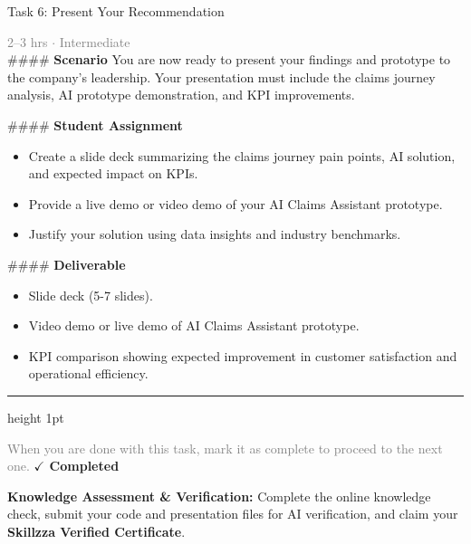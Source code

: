 \documentclass[10pt,a4paper]{article}
\begin{document}
\begin{taskbox}{Task 6: Present Your Recommendation}

    {\small \textcolor{gray}{2--3 hrs $\cdot$ Intermediate}}\\[12pt]

    \#\#\#\# \textbf{Scenario}  
You are now ready to present your findings and prototype to the company’s leadership. Your presentation must include the claims journey analysis, AI prototype demonstration, and KPI improvements.  

\#\#\#\# \textbf{Student Assignment}  
\begin{itemize}
    \item Create a slide deck summarizing the claims journey pain points, AI solution, and expected impact on KPIs.  
    \item Provide a live demo or video demo of your AI Claims Assistant prototype.  
    \item Justify your solution using data insights and industry benchmarks.  
\end{itemize}

\#\#\#\# \textbf{Deliverable}  
\begin{itemize}
    \item Slide deck (5-7 slides).  
    \item Video demo or live demo of AI Claims Assistant prototype.  
    \item KPI comparison showing expected improvement in customer satisfaction and operational efficiency.\par
\end{itemize}

    \vspace{16pt}

    \textcolor{cardBorder}{\hrule height 1pt}\vspace{8pt}

    \small \textcolor{gray}{When you are done with this task, mark it as complete to proceed to the next one.} \hfill \textbf{\textcolor{brandDark}{$\checkmark$ Completed}}

\end{taskbox}

\begin{completionbox}
    \textbf{Knowledge Assessment \& Verification:} Complete the online knowledge check, submit your code and presentation files for AI verification, and claim your \textbf{Skillzza Verified Certificate}.
\end{completionbox}
\end{document}
